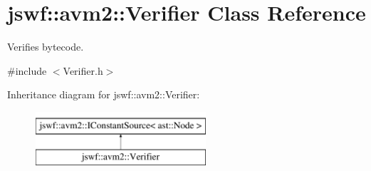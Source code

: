 \hypertarget{classjswf_1_1avm2_1_1_verifier}{\section{jswf\+:\+:avm2\+:\+:Verifier Class Reference}
\label{classjswf_1_1avm2_1_1_verifier}
}


Verifies bytecode.  




{\ttfamily \#include $<$Verifier.\+h$>$}

Inheritance diagram for jswf\+:\+:avm2\+:\+:Verifier\+:\begin{figure}[H]
\begin{center}
\leavevmode
\includegraphics[height=2.000000cm]{classjswf_1_1avm2_1_1_verifier}
\end{center}
\end{figure}
